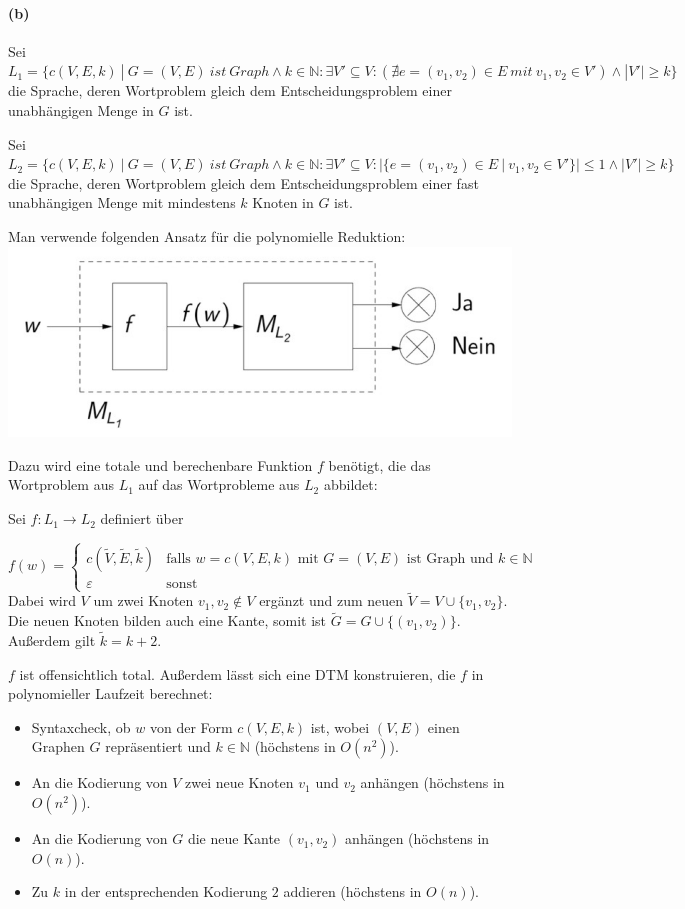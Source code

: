 \paragraph{(b)}
	Sei	$L_1=\{c(V,E,k)\ |\ G=(V,E)\ ist\ Graph \wedge k\in \mathbb{N}: \exists V' \subseteq V:(\nexists e=(v_1,v_2)\in E\ mit\ v_1,v_2 \in V') \wedge |V'|\geq k \}$\\
	die Sprache, deren Wortproblem gleich dem Entscheidungsproblem einer unabhängigen Menge in $G$ ist.

	Sei	$L_2=\{c(V,E,k)\ |\ G=(V,E)\ ist\ Graph \wedge k\in \mathbb{N}: \exists V' \subseteq V:|\{e=(v_1,v_2)\in E\ |\ v_1,v_2 \in V'\}|\leq 1 \wedge |V'|\geq k \}$\\
	die Sprache, deren Wortproblem gleich dem Entscheidungsproblem einer fast unabhängigen Menge mit mindestens $k$ Knoten in $G$ ist.

	Man verwende folgenden Ansatz für die polynomielle Reduktion:\\
	\includegraphics[scale=0.4]{thinf/sol/f23t2/reduction_idee_skizze}

	Dazu wird eine totale und berechenbare Funktion $f$ benötigt, die das Wortproblem aus $L_1$ auf das Wortprobleme aus $L_2$ abbildet:

	Sei $f:L_1 \rightarrow L_2$ definiert über

	$f(w)=\begin{cases}
		c(\tilde{V},\tilde{E},\tilde{k})&\text{falls $w=c(V,E,k)$ mit $G=(V,E)$ ist Graph und $k \in \mathbb{N}$}\\
		\varepsilon &\text{sonst}
	\end{cases}$\\
	Dabei wird $V$ um zwei Knoten $v_1,v_2 \notin V$ ergänzt und zum neuen $\tilde{V}=V\cup \{v_1,v_2\}$. Die neuen Knoten bilden auch eine Kante, somit ist $\tilde{G}=G\cup \{(v_1,v_2)\}$. Außerdem gilt $\tilde{k}=k+2$.

	$f$ ist offensichtlich total. Außerdem lässt sich eine DTM konstruieren, die $f$ in polynomieller Laufzeit berechnet:
	\begin{itemize}
		\item Syntaxcheck, ob $w$ von der Form $c(V,E,k)$ ist, wobei $(V,E)$ einen Graphen $G$ repräsentiert und $k \in \mathbb{N}$ (höchstens in $O(n^2)$).
		\item An die Kodierung von $V$ zwei neue Knoten $v_1$ und $v_2$ anhängen (höchstens in $O(n^2)$).
		\item An die Kodierung von $G$ die neue Kante $(v_1,v_2)$ anhängen (höchstens in $O(n)$).
		\item Zu $k$ in der entsprechenden Kodierung $2$ addieren (höchstens in $O(n)$).
	\end{itemize}

